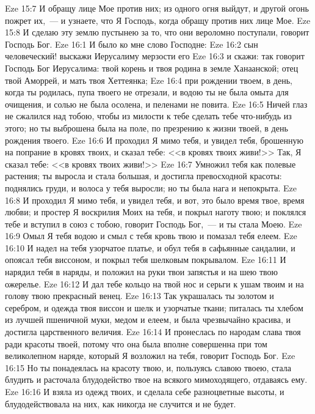 \vs Eze 15:7 И обращу лице Мое против них; из одного огня выйдут, и другой огонь пожрет их,~--- и узнаете, что Я Господь, когда обращу против них лице Мое.
\vs Eze 15:8 И сделаю эту землю пустынею за то, что они вероломно поступали, говорит Господь Бог.
\vs Eze 16:1 И было ко мне слово Господне:
\vs Eze 16:2 сын человеческий! выскажи Иерусалиму мерзости его
\vs Eze 16:3 и скажи: так говорит Господь Бог  Иерусалима: твой корень и твоя родина в земле Ханаанской; отец твой Аморрей, и мать твоя Хеттеянка;
\vs Eze 16:4 при рождении твоем, в день, когда ты родилась, пупа твоего не отрезали, и водою ты не была омыта для очищения, и солью не была осолена, и пеленами не повита.
\vs Eze 16:5 Ничей глаз не сжалился над тобою, чтобы из милости к тебе сделать тебе что-нибудь из этого; но ты выброшена была на поле, по презрению к жизни твоей, в день рождения твоего.
\vs Eze 16:6 И проходил Я мимо тебя, и увидел тебя, брошенную на попрание в кровях твоих, и сказал тебе: <<в кровях твоих живи!>> Так, Я сказал тебе: <<в кровях твоих живи!>>
\vs Eze 16:7 Умножил тебя как полевые растения; ты выросла и стала большая, и достигла превосходной красоты: поднялись груди, и волоса у тебя выросли; но ты была нага и непокрыта.
\vs Eze 16:8 И проходил Я мимо тебя, и увидел тебя, и вот, это было время твое, время любви; и простер Я воскрилия  Моих на тебя, и покрыл наготу твою; и поклялся тебе и вступил в союз с тобою, говорит Господь Бог,~--- и ты стала Моею.
\vs Eze 16:9 Омыл Я тебя водою и смыл с тебя кровь твою и помазал тебя елеем.
\vs Eze 16:10 И надел на тебя узорчатое платье, и обул тебя в сафьянные сандалии, и опоясал тебя виссоном, и покрыл тебя шелковым покрывалом.
\vs Eze 16:11 И нарядил тебя в наряды, и положил на руки твои запястья и на шею твою ожерелье.
\vs Eze 16:12 И дал тебе кольцо на твой нос и серьги к ушам твоим и на голову твою прекрасный венец.
\vs Eze 16:13 Так украшалась ты золотом и серебром, и одежда твоя  виссон и шелк и узорчатые ткани; питалась ты хлебом из лучшей пшеничной муки, медом и елеем, и была чрезвычайно красива, и достигла царственного величия.
\vs Eze 16:14 И пронеслась по народам слава твоя ради красоты твоей, потому что она была вполне совершенна при том великолепном наряде, который Я возложил на тебя, говорит Господь Бог.
\vs Eze 16:15 Но ты понадеялась на красоту твою, и, пользуясь славою твоею, стала блудить и расточала блудодейство твое на всякого мимоходящего, отдаваясь ему.
\vs Eze 16:16 И взяла из одежд твоих, и сделала себе разноцветные высоты, и блудодействовала на них, как никогда не случится и не будет.
